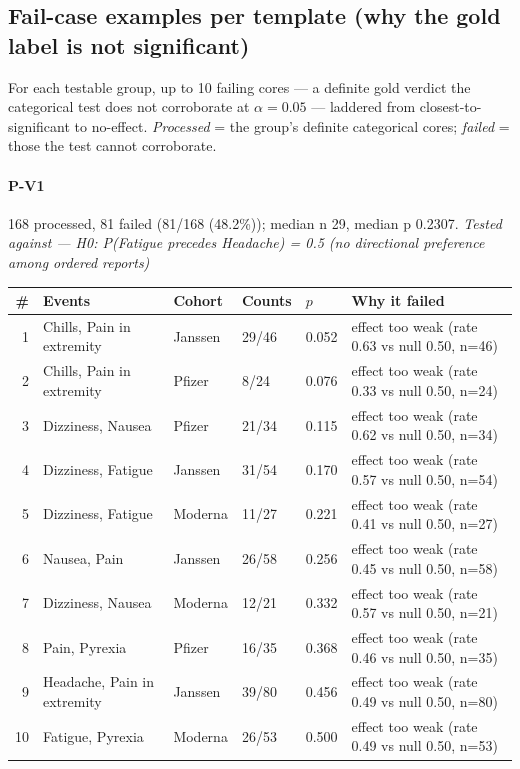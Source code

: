 \documentclass[11pt]{article}
\begin{document}
\subsection*{Fail-case examples per template (why the gold label is not significant)}
For each testable group, up to 10 failing cores --- a definite gold verdict the categorical test does not corroborate at $\alpha=0.05$ --- laddered from closest-to-significant to no-effect. \emph{Processed} = the group's definite categorical cores; \emph{failed} = those the test cannot corroborate.

\paragraph{P-V1} 168 processed, 81 failed (81/168 (48.2\%)); median n 29, median p 0.2307. \emph{Tested against --- H0: P(Fatigue precedes Headache) = 0.5 (no directional preference among ordered reports)} \\
\begin{longtable}{@{}r p{3.9cm} p{2.5cm} l l p{4.4cm}@{}}
\toprule
\# & Events & Cohort & Counts & $p$ & Why it failed \\
\midrule \endhead
1 & Chills, Pain in extremity & Janssen & 29/46 & 0.052 & effect too weak (rate 0.63 vs null 0.50, n=46) \\
2 & Chills, Pain in extremity & Pfizer & 8/24 & 0.076 & effect too weak (rate 0.33 vs null 0.50, n=24) \\
3 & Dizziness, Nausea & Pfizer & 21/34 & 0.115 & effect too weak (rate 0.62 vs null 0.50, n=34) \\
4 & Dizziness, Fatigue & Janssen & 31/54 & 0.170 & effect too weak (rate 0.57 vs null 0.50, n=54) \\
5 & Dizziness, Fatigue & Moderna & 11/27 & 0.221 & effect too weak (rate 0.41 vs null 0.50, n=27) \\
6 & Nausea, Pain & Janssen & 26/58 & 0.256 & effect too weak (rate 0.45 vs null 0.50, n=58) \\
7 & Dizziness, Nausea & Moderna & 12/21 & 0.332 & effect too weak (rate 0.57 vs null 0.50, n=21) \\
8 & Pain, Pyrexia & Pfizer & 16/35 & 0.368 & effect too weak (rate 0.46 vs null 0.50, n=35) \\
9 & Headache, Pain in extremity & Janssen & 39/80 & 0.456 & effect too weak (rate 0.49 vs null 0.50, n=80) \\
10 & Fatigue, Pyrexia & Moderna & 26/53 & 0.500 & effect too weak (rate 0.49 vs null 0.50, n=53) \\
\bottomrule
\end{longtable}
\end{document}
